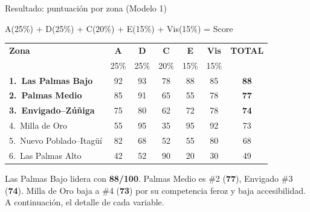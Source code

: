 \documentclass[aspectratio=169, 11pt]{beamer}
\begin{document}
\begin{frame}{Resultado: puntuaci\'{o}n por zona (Modelo 1)}

\vspace{2pt}
\begin{center}
{\scriptsize \textcolor{acc}{A}(25\%) + \textcolor{dem}{D}(25\%) + \textcolor{comp}{C}(20\%) + \textcolor{esp}{E}(15\%) + \textcolor{vis}{Vis}(15\%) = Score}

\vspace{6pt}

{\small
\begin{tabular}{@{}l ccccc c@{}}
\toprule
\textbf{Zona} & \textcolor{acc}{\textbf{A}} & \textcolor{dem}{\textbf{D}} & \textcolor{comp}{\textbf{C}} & \textcolor{esp}{\textbf{E}} & \textcolor{vis}{\textbf{Vis}} & \textbf{TOTAL} \\
& \textcolor{acc}{\tiny 25\%} & \textcolor{dem}{\tiny 25\%} & \textcolor{comp}{\tiny 20\%} & \textcolor{esp}{\tiny 15\%} & \textcolor{vis}{\tiny 15\%} & \\
\midrule
\rowcolor{acc!12}
\textbf{1.\ Las Palmas Bajo} & 92 & 93 & 78 & 88 & 85 & \textcolor{acc}{\textbf{88}} \\[2pt]
\textbf{2.\ Palmas Medio} & 85 & 91 & 65 & 55 & 78 & \textbf{77} \\[2pt]
\rowcolor{bglight}
\textbf{3.\ Envigado--Z\'{u}\~{n}iga} & 75 & 80 & 62 & 72 & 78 & \textbf{74} \\[2pt]
4.\ Milla de Oro & 55 & 95 & 35 & 95 & 92 & 73 \\[2pt]
\rowcolor{bglight}
5.\ Nuevo Poblado--Itag\"{u}\'{i} & 82 & 68 & 52 & 55 & 80 & 68 \\[2pt]
\rowcolor{comp!6}
6.\ Las Palmas Alto & 42 & 52 & 90 & 20 & 30 & \textcolor{comp}{49} \\
\bottomrule
\end{tabular}
}
\end{center}

\vspace{4pt}
{\scriptsize\color{slate}
Las Palmas Bajo lidera con \textbf{88/100}. Palmas Medio es \#2 (\textbf{77}), Envigado \#3 (\textbf{74}). Milla de Oro baja a \#4 (\textbf{73}) por su competencia feroz y baja accesibilidad. A continuaci\'{o}n, el detalle de cada variable.}
\end{frame}
\end{document}

